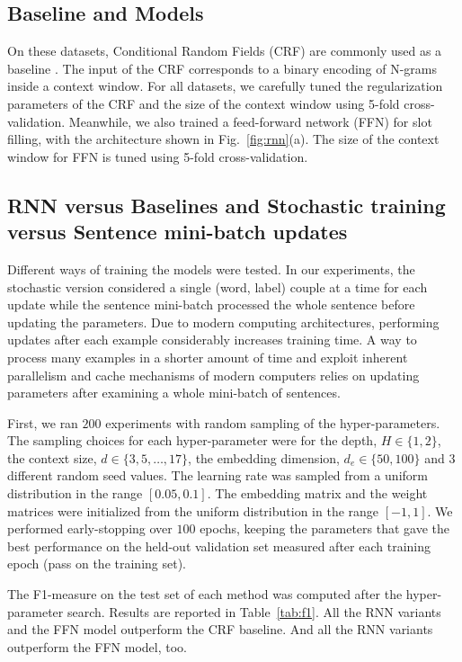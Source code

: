 \subsection{Baseline and Models}

On these datasets, Conditional Random Fields (CRF) are commonly used as a
baseline \citep{rnn7}. The input of the CRF corresponds to a binary encoding of N-grams
inside a context window. For all datasets, we carefully tuned the
regularization parameters of the CRF and the size of the context window using
5-fold cross-validation. Meanwhile, we also trained a feed-forward network
(FFN) for slot filling, with the architecture shown in Fig.~\ref{fig:rnn}(a).
The size of the context window for FFN is tuned using 5-fold cross-validation.

\subsection{RNN versus Baselines and Stochastic training versus Sentence mini-batch updates}

Different ways of training the models were tested. In our experiments, the
stochastic version considered a single (word, label) couple at a time for each
update while the sentence mini-batch processed the whole sentence before
updating the parameters. Due to modern computing architectures, performing
updates after each example considerably increases training time. A way to
process many examples in a shorter amount of time and exploit inherent
parallelism and cache mechanisms of modern computers relies on updating
parameters after examining a whole mini-batch of sentences.

First, we ran $200$ experiments with random sampling \citep{rnn14} of the
hyper-parameters. The sampling choices for each hyper-parameter were for the
depth, $H\in\{1,2\}$, the context size, $d\in\{3,5,\dots,17\}$, the embedding
dimension, $d_{e}\in\{50,100\}$ and $3$ different random seed values. The
learning rate was sampled from a uniform distribution in the range
$[0.05,0.1]$. The embedding matrix and the weight matrices were initialized
from the uniform distribution in the range $[-1,1]$. We performed
early-stopping over $100$ epochs, keeping the parameters that gave the best
performance on the held-out validation set measured after each training epoch
(pass on the training set). 

The F1-measure on the test set of each method was computed after the
hyper-parameter search. Results are reported in Table~\ref{tab:f1}. All the RNN variants
and the FFN model outperform the CRF baseline. And all the RNN variants
outperform the FFN model, too. 

